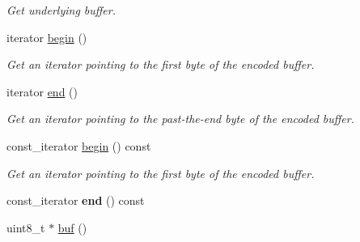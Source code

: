 \begin{DoxyCompactItemize}
\begin{DoxyCompactList}\small\item\em Get underlying buffer. \end{DoxyCompactList}\item 
iterator \hyperlink{classndn_1_1encoding_1_1Encoder_aadc9e46721459fb80310088bd7ae70c0}{begin} ()\hypertarget{classndn_1_1encoding_1_1Encoder_aadc9e46721459fb80310088bd7ae70c0}{}\label{classndn_1_1encoding_1_1Encoder_aadc9e46721459fb80310088bd7ae70c0}

\begin{DoxyCompactList}\small\item\em Get an iterator pointing to the first byte of the encoded buffer. \end{DoxyCompactList}\item 
iterator \hyperlink{classndn_1_1encoding_1_1Encoder_a538f62a04491340a072406ba1d8b06b1}{end} ()\hypertarget{classndn_1_1encoding_1_1Encoder_a538f62a04491340a072406ba1d8b06b1}{}\label{classndn_1_1encoding_1_1Encoder_a538f62a04491340a072406ba1d8b06b1}

\begin{DoxyCompactList}\small\item\em Get an iterator pointing to the past-\/the-\/end byte of the encoded buffer. \end{DoxyCompactList}\item 
const\+\_\+iterator \hyperlink{classndn_1_1encoding_1_1Encoder_a73297077555bcc2ae5203f1a7fec9ba8}{begin} () const\hypertarget{classndn_1_1encoding_1_1Encoder_a73297077555bcc2ae5203f1a7fec9ba8}{}\label{classndn_1_1encoding_1_1Encoder_a73297077555bcc2ae5203f1a7fec9ba8}

\begin{DoxyCompactList}\small\item\em Get an iterator pointing to the first byte of the encoded buffer. \end{DoxyCompactList}\item 
const\+\_\+iterator {\bfseries end} () const\hypertarget{classndn_1_1encoding_1_1Encoder_a467d6e4a511b8aaf8085dc083e640bf5}{}\label{classndn_1_1encoding_1_1Encoder_a467d6e4a511b8aaf8085dc083e640bf5}

\item 
uint8\+\_\+t $\ast$ \hyperlink{classndn_1_1encoding_1_1Encoder_a975e84acfea557a66e1fea1146728294}{buf} ()\hypertarget{classndn_1_1encoding_1_1Encoder_a975e84acfea557a66e1fea1146728294}{}\label{classndn_1_1encoding_1_1Encoder_a975e84acfea557a66e1fea1146728294}


\end{DoxyCompactItemize}
